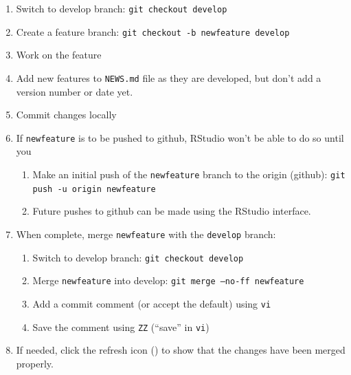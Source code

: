 \documentclass{article}
\begin{document}
\begin{enumerate}

  \item Switch to develop branch: \texttt{git checkout develop}

  \item Create a feature branch: \texttt{git checkout -b newfeature develop} 
  
  \item Work on the feature
  
  \item Add new features to \texttt{NEWS.md} file as they are developed, but
        don't add a version number or date yet.

  \item Commit changes locally

  \item If \texttt{newfeature} is to be pushed to github, RStudio won't be able to do so until you
  \begin{enumerate}

    \item Make an initial push of the \texttt{newfeature} branch
	      to the origin (github):
		  \texttt{git push -u origin newfeature} 
	
	\item Future pushes to github can be made using the RStudio interface.

  \end{enumerate}
  \item When complete, merge \texttt{newfeature} with the \texttt{develop} branch:
  \begin{enumerate}

    \item Switch to develop branch: \texttt{git checkout develop}

    \item Merge \texttt{newfeature} into develop: \texttt{git merge --no-ff newfeature}
	
	\item Add a commit comment (or accept the default) using \texttt{vi} 
	
	\item Save the comment using \texttt{ZZ} (``save'' in \texttt{vi})

  \end{enumerate}
  \item If needed, click the refresh icon 
		() to show that the 
		changes have been merged properly.
  

\end{enumerate}
\end{document}

